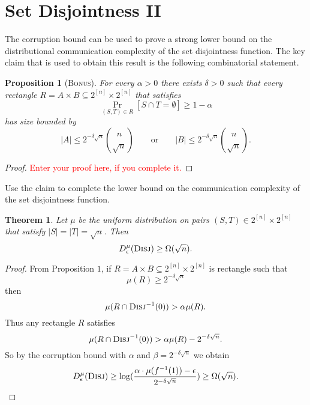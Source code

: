 \documentclass[11pt]{amsart}
\theoremstyle{plain}
\newtheorem{theorem}{Theorem}
\newtheorem{proposition}{Proposition}
\theoremstyle{definition}
\theoremstyle{plain}
\newcommand{\Disj}{\textsc{Disj}}
\newcommand{\replacethistext}[1]{\textcolor{red}{#1}}
\begin{document}
\newpage \section{Set Disjointness II}

The corruption bound can be used to prove a strong lower bound on the distributional communication complexity of the set disjointness function. The key claim that is used to obtain this result is the following combinatorial statement.

\begin{proposition}[\textsc{Bonus}]
For every $\alpha >0$ there exists $\delta>0$ such that every rectangle $R = A \times B \subseteq 2^{[n]} \times 2^{[n]}$
that satisfies 
\[
\Pr_{(S,T) \in R}[ S \cap T = \emptyset ] \ge 1-\alpha
\]
has size bounded by
\[
|A| \le 2^{-\delta \sqrt{n}} \binom{n}{\sqrt{n}}
\qquad \mbox{or} \qquad
|B| \le 2^{-\delta \sqrt{n}} \binom{n}{\sqrt{n}}.
\]
\end{proposition}

\begin{proof}
\replacethistext{Enter your proof here, if you complete it.}
\end{proof}

Use the claim to complete the lower bound on the communication complexity of the set disjointness function.

\begin{theorem}
Let $\mu$ be the uniform distribution on pairs $(S,T) \in 2^{[n]} \times 2^{[n]}$ that satisfy $|S| = |T| = \sqrt{n}$. Then
\[
D_\epsilon^{\mu}(\textsc{Disj}) \ge \Omega(\sqrt{n}).
\]
\end{theorem}

\begin{proof}
From Proposition $1$, if $R = A\times B \subseteq 2^{[n]}\times 2^{[n]}$ is rectangle such that
$$\mu(R) \geq 2^{-\delta\sqrt{n}}$$ then
$$\mu(R\cap \Disj^{-1}(0)) > \alpha \mu(R).$$	
Thus any rectangle $R$ satisfies
$$\mu(R\cap \Disj^{-1}(0)) > \alpha \mu(R) - 2^{-\delta\sqrt{n}}.$$
So by the corruption bound with $\alpha$ and $\beta = 2^{-\delta\sqrt{n}}$ we obtain
$$D^{\mu}_\epsilon(\Disj) \geq \log(\frac{\alpha\cdot \mu(f^{-1}(1)) - \epsilon}{2^{-\delta\sqrt{n}}}) \geq \Omega(\sqrt{n}).$$\end{proof}
\end{document}
